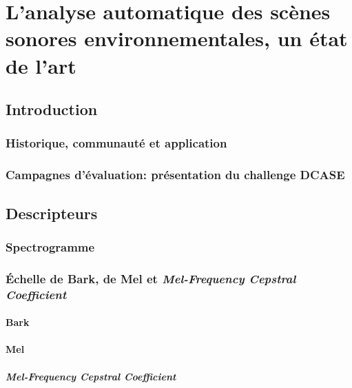 \chapter[État de l'art]{L'analyse automatique des scènes sonores environnementales, un état de l'art}\label{ch:ml_ea}


\section{Introduction}

\subsection{Historique, communauté et application}


\subsection{Campagnes d'évaluation: présentation du challenge DCASE}

\section{Descripteurs}

\subsection{Spectrogramme}
\label{sec:ch6_spec}

\subsection{Échelle de Bark, de Mel et \emph{Mel-Frequency Cepstral Coefficient}}

\subsubsection{Bark}
\label{sec:ch6_Bark}

\subsubsection{Mel}
\label{sec:ch6_Mel}

\subsubsection{\emph{Mel-Frequency Cepstral Coefficient}}
\label{sec:ch6_mfcc}
 
